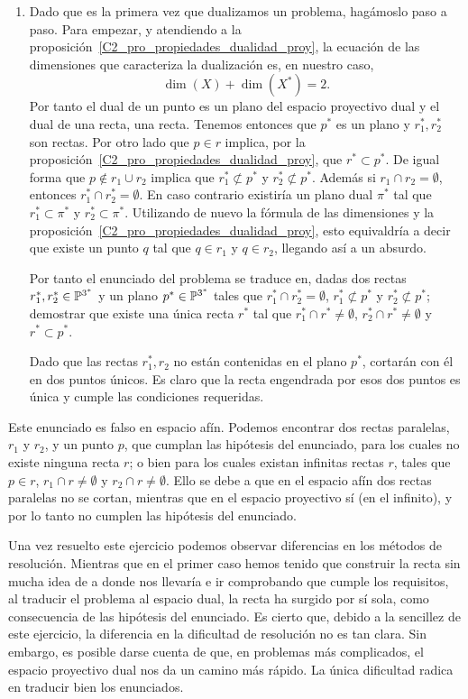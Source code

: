 \begin{exa}
\begin{enumerate}
		\item Dado que es la primera vez que dualizamos un problema, hagámoslo paso a paso. Para empezar, y atendiendo a la proposición~\ref{C2_pro_propiedades_dualidad_proy}, la ecuación de las dimensiones que caracteriza la dualización es, en nuestro caso,
		\begin{equation*}
		\dim(X)+\dim(X^*)=2. 
		\end{equation*}
		Por tanto el dual de un punto es un plano del espacio proyectivo dual y el dual de una recta, una recta. Tenemos entonces que $p^*$ es un plano y $r_1^*,r_2^*$ son rectas. Por otro lado que $p\in r$ implica, por la proposición~\ref{C2_pro_propiedades_dualidad_proy}, que $r^*\subset p^*$. De igual forma que $p\not\in r_1\cup r_2$ implica que $r_1^*\not\subset p^*$ y $r_2^*\not\subset p^*$. Además si $r_1\cap r_2=\emptyset$, entonces $r_1^*\cap r_2^*=\emptyset$. En caso contrario existiría un plano dual $\pi^*$ tal que $r_1^*\subset\pi^*$ y $r_2^*\subset\pi^*$. Utilizando de nuevo la fórmula de las dimensiones y la proposición~\ref{C2_pro_propiedades_dualidad_proy}, esto equivaldría a decir que existe un punto $q$ tal que $q\in r_1$ y $q\in r_2$, llegando así a un absurdo.
		
		Por tanto el enunciado del problema se traduce en, dadas dos rectas $r_1^*, r_2^*\in\mathbb{P}^{3^*}$ y un plano $p^*\in\mathbb{P}^{3^*}$ tales que $r_1^*\cap r_2^*=\emptyset$, $r_1^*\not\subset p^*$ y $r_2^*\not\subset p^*$; demostrar que existe una única recta $r^*$ tal que $r_1^*\cap r^*\not=\emptyset$, $r_2^*\cap r^*\not=\emptyset$ y $r^*\subset p^*$.
		
		Dado que las rectas $r_1^*, r_2$ no están contenidas en el plano $p^*$, cortarán con él en dos puntos únicos. Es claro que la recta engendrada por esos dos puntos es única y cumple las condiciones requeridas.
	\end{enumerate}
\end{exa}
\begin{obs}
	Este enunciado es falso en espacio afín. Podemos encontrar dos rectas paralelas, $r_1$ y $r_2$, y un punto $p$, que cumplan las hipótesis del enunciado, para los cuales no existe ninguna recta $r$; o bien para los cuales existan infinitas rectas $r$, tales que $p\in r$, $r_1\cap r\not=\emptyset$ y $r_2\cap r\not=\emptyset$. Ello se debe a que en el espacio afín dos rectas paralelas no se cortan, mientras que en el espacio proyectivo sí (en el infinito), y por lo tanto no cumplen las hipótesis del enunciado.
\end{obs}
\begin{obs}
	Una vez resuelto este ejercicio podemos observar diferencias en los métodos de resolución. Mientras que en el primer caso hemos tenido que construir la recta sin mucha idea de a donde nos llevaría e ir comprobando que cumple los requisitos, al traducir el problema al espacio dual, la recta ha surgido por sí sola, como consecuencia de las hipótesis del enunciado. Es cierto que, debido a la sencillez de este ejercicio, la diferencia en la dificultad de resolución no es tan clara. Sin embargo, es posible darse cuenta de que, en problemas más complicados, el espacio proyectivo dual nos da un camino más rápido. La única dificultad radica en traducir bien los enunciados.
\end{obs}